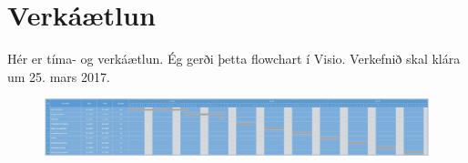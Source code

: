 \section{Verkáætlun}
Hér er tíma- og verkáætlun. Ég gerði þetta flowchart í Visio.  Verkefnið skal klára um 25. mars 2017. 
\begin{figure}[h]
\includegraphics[scale=.3]{img/Timaogverkplan}
\end{figure}